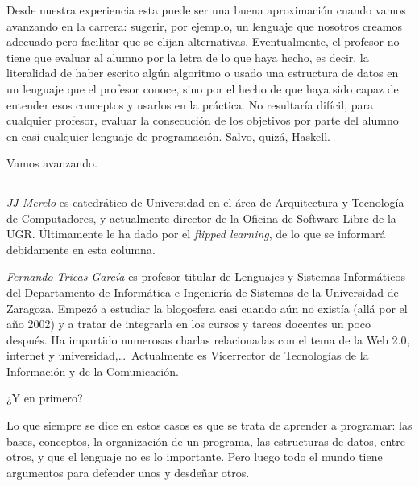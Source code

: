 \documentclass[twoside,10pt]{article}
\newcounter{num}
\begin{document}
\begin{multicols}{2}
Desde nuestra experiencia esta puede ser una buena aproximación cuando
vamos avanzando en la carrera: sugerir, por ejemplo, un lenguaje que
nosotros creamos adecuado pero facilitar que se elijan alternativas.
Eventualmente, el profesor no tiene que evaluar al
alumno por la letra de lo que haya hecho, es decir, la literalidad de
haber escrito algún algoritmo o usado una estructura de datos en un
lenguaje que el profesor conoce, sino por el hecho de que haya sido
capaz de entender esos conceptos y usarlos en la práctica. No
resultaría difícil, para cualquier profesor, evaluar la consecución de
los objetivos por parte del alumno en casi cualquier lenguaje de
programación. Salvo, quizá, Haskell.

Vamos avanzando.


\noindent\rule{86mm}{1pt}
\vspace{1ex} {\small{\begin{window} 
\noindent\emph{JJ Merelo} es catedrático de Universidad
en el área de Arquitectura y Tecnología de Computadores, y
actualmente director de la Oficina de Software Libre de la UGR.
Últimamente le ha dado por el \textsl{flipped
learning}, de lo que se informará debidamente en esta columna.
\end{window}}} 
\medskip

{\small{\begin{window}
		\noindent \emph{Fernando Tricas García} es profesor
		titular de Lenguajes y Sistemas Informáticos del Departamento
		de Informática e Ingeniería de Sistemas de la Universidad de
		Zaragoza.  Empezó a estudiar la blogosfera casi cuando aún no
		existía (allá por el año 2002) y a tratar de integrarla en los
		cursos y tareas docentes un poco después.  Ha impartido
		numerosas charlas relacionadas con el tema de la Web 2.0, 
		internet y universidad,\ldots\ 
		Actualmente es Vicerrector de Tecnologías de la Información y
de la Comunicación.   
		\end{window}}}

 
¿Y en primero? 

Lo que siempre se dice en estos casos es que se trata de aprender a
programar: las bases, conceptos, la organización de un programa, las
estructuras de datos, entre otros, y que el lenguaje no es lo importante.
Pero luego todo el mundo tiene argumentos para defender unos
y desdeñar otros.


\end{multicols}
\end{document}
